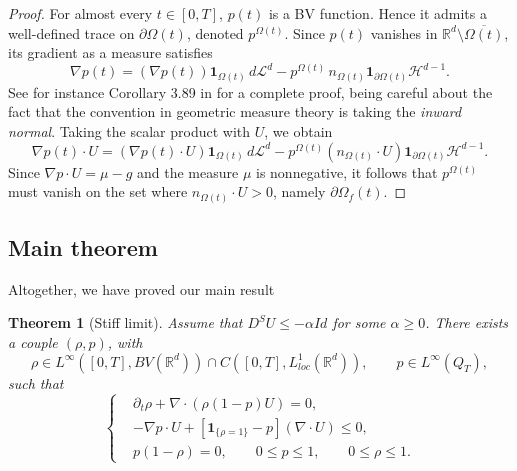 \documentclass[11pt,twoside]{article}
\numberwithin{equation}{section}
\newcommand{\R}{\mathbb{R}}
\newcommand {\p}   {\partial}
\newtheorem{theorem}{Theorem}[section]
\begin{document}
\begin{proof}
For almost every $t\in[0,T]$, $p(t)$ is a BV function. 
Hence it admits a well-defined trace on $\partial\Omega(t)$, denoted 
$p^{\Omega(t)}$. 
Since $p(t)$ vanishes in $\R^d\setminus\overline{\Omega(t)}$, 
its gradient as a measure satisfies
\[
\nabla p(t)
=
(\nabla p(t))\mathbf{1}_{\Omega(t)}\, d\mathcal{L}^d
-
p^{\Omega(t)} \, n_{\Omega(t)} 
\mathbf{1}_{\partial\Omega(t)} \mathcal{H}^{d-1}.
\]
See for instance Corollary 3.89 in \cite{ambrosio_functions_2000} for a complete proof, being careful about the fact that the convention in geometric measure theory is taking the \textit{inward normal}.
Taking the scalar product with $U$, we obtain
\[
\nabla p(t)\cdot U
=
(\nabla p(t)\cdot U)\mathbf{1}_{\Omega(t)}\, d\mathcal{L}^d
-
p^{\Omega(t)} (n_{\Omega(t)}\cdot U)
\mathbf{1}_{\partial\Omega(t)} \mathcal{H}^{d-1}.
\]
Since $\nabla p\cdot U = \mu-g$ and the measure $\mu$ is nonnegative, it follows that
$p^{\Omega(t)}$ must vanish on the set where 
$n_{\Omega(t)}\cdot U>0$, namely $\p \Omega_f(t)$.
\end{proof}


\subsection{Main theorem}

Altogether, we have proved our main result

\begin{theorem}[Stiff limit] 
\label{thm:main}
Assume that $D^SU \leq -\alpha Id$ for some $\alpha \geq 0$. There exists a couple $(\rho,p)$, with 
\[
\rho \in L^{\infty}([0,T], BV(\R^d)) \cap C([0,T],L^1_{loc}(\R^d)),
\qquad 
p \in L^{\infty}(Q_T),
\]
such that
\begin{equation}
\left\{
\begin{aligned}
 &\partial_t \rho + \nabla \cdot (\rho (1-p)U) = 0, \\
 &-\nabla p \cdot U +[\mathbf{1}_{\{\rho = 1\}}-p](\nabla \cdot U)  \le 0, \\
 &p(1-\rho) = 0, 
 \qquad 0 \le p \le 1, \qquad 0 \leq \rho \leq 1.
\end{aligned}
\right.
\end{equation}
\end{theorem}
\end{document}
